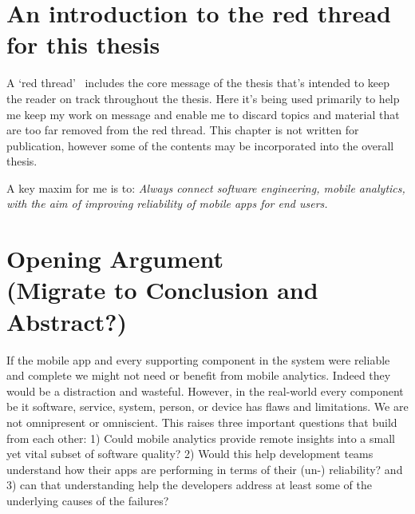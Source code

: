 \section[An introduction to the red thread for this thesis]{An introduction to the red thread for this thesis}
\label{section_read_thread} 

A `red thread'~\footnotemark 
includes the core message of the thesis that's intended to keep the reader on track throughout the thesis. Here it's being used primarily to help me keep my work on message and enable me to discard topics and material that are too far removed from the red thread. This chapter is not written for publication, however some of the contents may be incorporated into the overall thesis.


A key maxim for me is to: \emph{Always connect software engineering, mobile analytics, with the aim of improving reliability of mobile apps for end users.}



\clearpage
\section[Opening argument]{Opening Argument \\ \small{(Migrate to Conclusion and Abstract?)}}
If the mobile app and every supporting component in the system were reliable and complete we might not need or benefit from mobile analytics. Indeed they would be a distraction and wasteful. However, in the real-world every component be it software, service, system, person, or device has flaws and limitations. We are not omnipresent or omniscient. 
This raises three important questions that build from each other: 1) Could mobile analytics provide remote insights into a small yet vital subset of software quality? 2) Would this help development teams understand how their apps are performing in terms of their (un-) reliability? and 3) can that understanding help the developers address at least some of the underlying causes of the failures?

